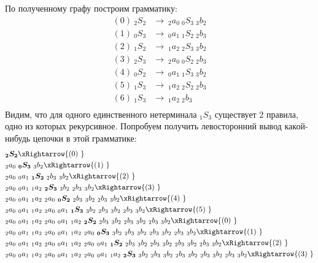 \begin{example}
    По полученному графу построим грамматику:
    \begin{align*}
        (0)\ _2S_2   &\to\ _2a_0\ _0S_3\ _3b_2 \\ 
        (1)\ _0S_3   &\to\ _0a_1\ _1S_2\ _2b_3 \\
        (2)\ _1S_2   &\to\ _1a_2\ _2S_3\ _3b_2 \\ 
        (3)\ _2S_3   &\to\ _2a_0\ _0S_2\ _2b_3 \\ 
        (4)\ _0S_2   &\to\ _0a_1\ _1S_3\ _3b_2 \\ 
        (5)\ _1S_3   &\to\ _1a_2\ _2S_2\ _2b_3 \\ 
        (6)\ _1S_3   &\to\ _1a_2\ _2b_3 \\ 
    \end{align*}
    Видим, что для одного единственного нетерминала $_1S_3$ существует 2 правила, одно из которых рекурсивное. Попробуем получить левосторонний вывод какой-нибудь цепочки в этой грамматике: 
    \begin{align*}
        & \boldsymbol{_2S_2} \xRightarrow{(0)\ } \\
        & {_2a_0}\ \boldsymbol{_0S_3}\ {_3b_2} \xRightarrow{(1)\ } \\
        & {_2a_0}\ {_0a_1}\ \boldsymbol{_1S_2}\ {_2b_3}\ {_3b_2} \xRightarrow{(2)\ } \\
        & {_2a_0}\ {_0a_1}\ {_1a_2}\ \boldsymbol{_2S_3}\ {_3b_2}\ {_2b_3}\ {_3b_2} \xRightarrow{(3)\ } \\
        & {_2a_0}\ {_0a_1}\ {_1a_2}\ {_2a_0}\ \boldsymbol{_0S_2}\ {_2b_3}\ {_3b_2}\ {_2b_3}\ {_3b_2} \xRightarrow{(4)\ } \\
        & {_2a_0}\ {_0a_1}\ {_1a_2}\ {_2a_0}\ {_0a_1}\ \boldsymbol{_1S_3}\ {_3b_2}\ {_2b_3}\ {_3b_2}\ {_2b_3}\ {_3b_2} \xRightarrow{(5)\ } \\
        & {_2a_0}\ {_0a_1}\ {_1a_2}\ {_2a_0}\ {_0a_1}\ {_1a_2}\ \boldsymbol{_2S_2}\ {_2b_3}\ {_3b_2}\ {_2b_3}\ {_3b_2}\ {_2b_3}\ {_3b_2} \xRightarrow{(0)\ } \\
        & {_2a_0}\ {_0a_1}\ {_1a_2}\ {_2a_0}\ {_0a_1}\ {_1a_2}\ {_2a_0}\ \boldsymbol{_0S_3}\ {_3b_2}\ {_2b_3}\ {_3b_2}\ {_2b_3}\ {_3b_2}\ {_2b_3}\ {_3b_2} \xRightarrow{(1)\ } \\
        & {_2a_0}\ {_0a_1}\ {_1a_2}\ {_2a_0}\ {_0a_1}\ {_1a_2}\ {_2a_0}\ {_0a_1}\ \boldsymbol{_1S_2}\ {_2b_3}\ {_3b_2}\ {_2b_3}\ {_3b_2}\ {_2b_3}\ {_3b_2}\ {_2b_3}\ {_3b_2} \xRightarrow{(2)\ } \\
        & {_2a_0}\ {_0a_1}\ {_1a_2}\ {_2a_0}\ {_0a_1}\ {_1a_2}\ {_2a_0}\ {_0a_1}\ {_1a_2}\ \boldsymbol{_2S_3}\ {_3b_2}\ {_2b_3}\ {_3b_2}\ {_2b_3}\ {_3b_2}\ {_2b_3}\ {_3b_2}\ {_2b_3}\ {_3b_2} \xRightarrow{(3)\ } \\

\end{align*}
\end{example}
